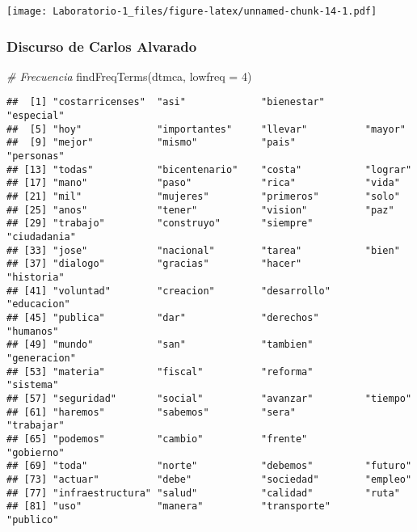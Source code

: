 \documentclass[
]{article}
\newenvironment{Shaded}{\begin{snugshade}}{\end{snugshade}}
\newcommand{\AttributeTok}[1]{\textcolor[rgb]{0.77,0.63,0.00}{#1}}
\newcommand{\CommentTok}[1]{\textcolor[rgb]{0.56,0.35,0.01}{\textit{#1}}}
\newcommand{\DecValTok}[1]{\textcolor[rgb]{0.00,0.00,0.81}{#1}}
\newcommand{\FunctionTok}[1]{\textcolor[rgb]{0.00,0.00,0.00}{#1}}
\newcommand{\NormalTok}[1]{#1}
\begin{document}
\texttt{[image: Laboratorio-1\_files/figure-latex/unnamed-chunk-14-1.pdf]}

\hypertarget{discurso-de-carlos-alvarado-1}{%
\subsubsection{Discurso de Carlos
Alvarado}\label{discurso-de-carlos-alvarado-1}}

\begin{Shaded}
\begin{Highlighting}[]
\CommentTok{\# Frecuencia}
\FunctionTok{findFreqTerms}\NormalTok{(dtmca, }\AttributeTok{lowfreq =} \DecValTok{4}\NormalTok{)}
\end{Highlighting}
\end{Shaded}

\begin{verbatim}
##  [1] "costarricenses"  "asi"             "bienestar"       "especial"       
##  [5] "hoy"             "importantes"     "llevar"          "mayor"          
##  [9] "mejor"           "mismo"           "pais"            "personas"       
## [13] "todas"           "bicentenario"    "costa"           "lograr"         
## [17] "mano"            "paso"            "rica"            "vida"           
## [21] "mil"             "mujeres"         "primeros"        "solo"           
## [25] "anos"            "tener"           "vision"          "paz"            
## [29] "trabajo"         "construyo"       "siempre"         "ciudadania"     
## [33] "jose"            "nacional"        "tarea"           "bien"           
## [37] "dialogo"         "gracias"         "hacer"           "historia"       
## [41] "voluntad"        "creacion"        "desarrollo"      "educacion"      
## [45] "publica"         "dar"             "derechos"        "humanos"        
## [49] "mundo"           "san"             "tambien"         "generacion"     
## [53] "materia"         "fiscal"          "reforma"         "sistema"        
## [57] "seguridad"       "social"          "avanzar"         "tiempo"         
## [61] "haremos"         "sabemos"         "sera"            "trabajar"       
## [65] "podemos"         "cambio"          "frente"          "gobierno"       
## [69] "toda"            "norte"           "debemos"         "futuro"         
## [73] "actuar"          "debe"            "sociedad"        "empleo"         
## [77] "infraestructura" "salud"           "calidad"         "ruta"           
## [81] "uso"             "manera"          "transporte"      "publico"
\end{verbatim}
\end{document}

